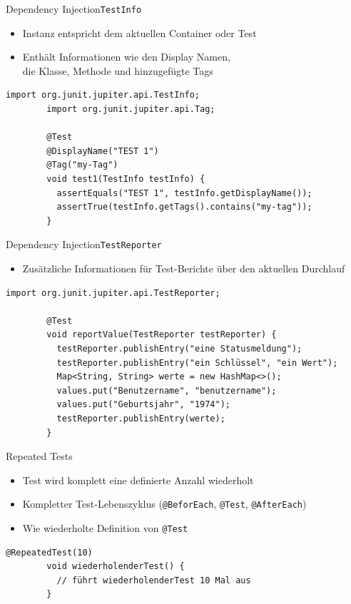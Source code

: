 \documentclass[utf8,t,aspectratio=169]{beamer}
\begin{document}
    \begin{frame}[fragile]{Dependency Injection}{\lstinline|TestInfo|}
      \begin{itemize}
          \item Instanz entspricht dem aktuellen Container oder Test
          \item Enthält Informationen wie den Display Namen,\\
            die Klasse, Methode und hinzugefügte Tags
      \end{itemize}
      \begin{lstlisting}[gobble=8]
        import org.junit.jupiter.api.TestInfo;
        import org.junit.jupiter.api.Tag;

        @Test
        @DisplayName("TEST 1")
        @Tag("my-Tag")
        void test1(TestInfo testInfo) {
          assertEquals("TEST 1", testInfo.getDisplayName());
          assertTrue(testInfo.getTags().contains("my-tag"));
        }
      \end{lstlisting}
    \end{frame}
    \begin{frame}[fragile]{Dependency Injection}{\lstinline|TestReporter|}
      \begin{itemize}
          \item Zusätzliche Informationen für Test-Berichte über den
            aktuellen Durchlauf
      \end{itemize}
      \begin{lstlisting}[gobble=8]
        import org.junit.jupiter.api.TestReporter;

        @Test
        void reportValue(TestReporter testReporter) {
          testReporter.publishEntry("eine Statusmeldung");
          testReporter.publishEntry("ein Schlüssel", "ein Wert");
          Map<String, String> werte = new HashMap<>();
          values.put("Benutzername", "benutzername");
          values.put("Geburtsjahr", "1974");
          testReporter.publishEntry(werte);
        }
      \end{lstlisting}
    \end{frame}
    \begin{frame}[fragile]{Repeated Tests}
      \begin{itemize}
        \item Test wird komplett eine definierte Anzahl wiederholt
        \item Kompletter Test-Lebenszyklus (\lstinline|@BeforEach|,
          \lstinline|@Test|, \lstinline|@AfterEach|)
        \item Wie wiederholte Definition von \lstinline|@Test|
      \end{itemize}
      \begin{lstlisting}[gobble=8]
        @RepeatedTest(10) 
        void wiederholenderTest() {
          // führt wiederholenderTest 10 Mal aus
        }
      \end{lstlisting}
    \end{frame}
\end{document}
